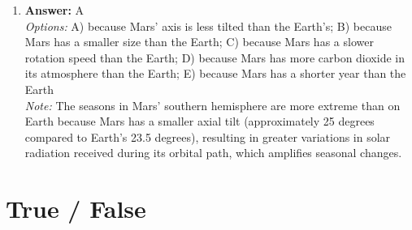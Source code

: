 \documentclass[12pt]{article}
\begin{document}
\begin{enumerate}[label=\arabic*.]
\item \textbf{Answer:} A
\\ \textit{Options:} A) because Mars' axis is less tilted than the Earth's; B) because Mars has a smaller size than the Earth; C) because Mars has a slower rotation speed than the Earth; D) because Mars has more carbon dioxide in its atmosphere than the Earth; E) because Mars has a shorter year than the Earth
\\ \textit{Note:} The seasons in Mars' southern hemisphere are more extreme than on Earth because Mars has a smaller axial tilt (approximately 25 degrees compared to Earth's 23.5 degrees), resulting in greater variations in solar radiation received during its orbital path, which amplifies seasonal changes.
\end{enumerate}

\section*{True / False}
\end{document}
